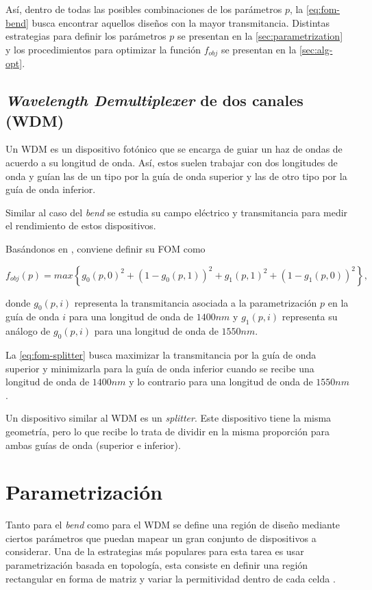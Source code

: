 Así, dentro de todas las posibles combinaciones de los parámetros $p$, la
 \autoref{eq:fom-bend} busca encontrar aquellos diseños con la mayor transmitancia.
Distintas estrategias para definir los parámetros $p$ se presentan en la
\autoref{sec:parametrization} y 
los procedimientos para optimizar la función $f_{obj}$ se presentan en la
\autoref{sec:alg-opt}.

\subsection{\emph{Wavelength Demultiplexer} de dos canales (WDM)}

Un WDM es un dispositivo fotónico que se encarga de guiar un haz de ondas de acuerdo a su longitud de onda.
Así, estos suelen trabajar con dos longitudes de onda y guían las de un tipo por la guía de onda superior y las de otro tipo por la guía de onda inferior.

Similar al caso del \emph{bend} se estudia su campo eléctrico y transmitancia para medir el rendimiento de estos dispositivos.

Basándonos en \cite{Su2020}, conviene definir su FOM como

\begin{equation}
  f_{obj}(p) = max \left \{ g_0(p, 0)^2 + (1 - g_0(p, 1))^2 + g_1(p, 1)^2 + (1
  - g_1(p, 0))^2 \right \},
\label{eq:fom-splitter}
\end{equation}

donde $g_0(p, i)$ representa la transmitancia asociada a la parametrización $p$ en la guía de onda $i$ para una longitud de onda de $1400 nm$ y 
      $g_1(p, i)$ representa su análogo de $g_0(p, i)$ para una longitud de onda de $1550 nm$.

La \autoref{eq:fom-splitter} busca maximizar la transmitancia por la guía de onda superior y minimizarla para la guía de onda inferior cuando se recibe una longitud de onda de $1400 nm$ y lo contrario para una longitud de onda de $1550 nm$.

Un dispositivo similar al WDM es un \emph{splitter}. Este dispositivo tiene la
misma geometría, pero lo que recibe lo trata de dividir en la misma proporción
para ambas guías de onda (superior e inferior).

\section{Parametrización}\label{sec:parametrization}

Tanto para el \emph{bend} como para el WDM se define una región de diseño
mediante ciertos parámetros que puedan mapear un gran conjunto de dispositivos a considerar.
Una de la estrategias más populares para esta tarea es usar parametrización
basada en topología, esta consiste en definir una región rectangular en forma
de matriz y variar la permitividad dentro de cada celda \citep{Molesky2018}.

